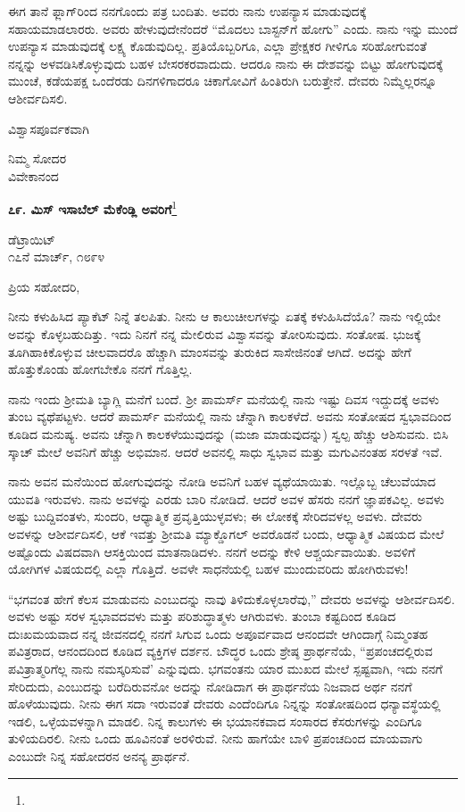ಈಗ ತಾನೆ ಫ್ಲಾಗ್‌ರಿಂದ ನನಗೊಂದು ಪತ್ರ ಬಂದಿತು. ಅವರು ನಾನು ಉಪನ್ಯಾಸ ಮಾಡುವುದಕ್ಕೆ ಸಹಾಯಮಾಡಲಾರರು. ಅವರು ಹೇಳುವುದೇನೆಂದರೆ “ಮೊದಲು ಬಾಸ್ಟನ್‌ಗೆ ಹೋಗು” ಎಂದು. ನಾನು ಇನ್ನು ಮುಂದೆ ಉಪನ್ಯಾಸ ಮಾಡುವುದಕ್ಕೆ ಲಕ್ಷ್ಯ ಕೊಡುವುದಿಲ್ಲ. ಪ್ರತಿಯೊಬ್ಬರಿಗೂ, ಎಲ್ಲಾ ಪ್ರೇಕ್ಷಕರ ಗೀಳಿಗೂ ಸರಿಹೋಗುವಂತೆ ನನ್ನನ್ನು ಅಳವಡಿಸಿಕೊಳ್ಳುವುದು ಬಹಳ ಬೇಸರಕರವಾದುದು. ಆದರೂ ನಾನು ಈ ದೇಶವನ್ನು ಬಿಟ್ಟು ಹೋಗುವುದಕ್ಕೆ ಮುಂಚೆ, ಕಡೆಯಪಕ್ಷ ಒಂದೆರಡು ದಿನಗಳಿಗಾದರೂ ಚಿಕಾಗೋವಿಗೆ ಹಿಂತಿರುಗಿ ಬರುತ್ತೇನೆ. ದೇವರು ನಿಮ್ಮೆಲ್ಲರನ್ನೂ ಆಶೀರ್ವದಿಸಲಿ.

ವಿಶ್ವಾಸಪೂರ್ವಕವಾಗಿ

\begin{flushright}
ನಿಮ್ಮ ಸೋದರ\\ವಿವೇಕಾನಂದ
\end{flushright}

\begin{center}
\textbf{೭೯. ಮಿಸ್ ಇಸಾಬೆಲ್ ಮೆಕೆಂಡ್ಲಿ ಅವರಿಗೆ}\footnote{}
\end{center}

\begin{flushright}
ಡೆಟ್ರಾಯಿಟ್\\೧೭ನೆ ಮಾರ್ಚ್, ೧೮೯೪
\end{flushright}

\noindent
ಪ್ರಿಯ ಸಹೋದರಿ,

ನೀನು ಕಳುಹಿಸಿದ ಪ್ಯಾಕೆಟ್ ನಿನ್ನೆ ತಲಪಿತು. ನೀನು ಆ ಕಾಲುಚೀಲಗಳನ್ನು ಏತಕ್ಕೆ ಕಳುಹಿಸಿದೆಯೊ? ನಾನು ಇಲ್ಲಿಯೇ ಅವನ್ನು ಕೊಳ್ಳಬಹುದಿತ್ತು. ಇದು ನಿನಗೆ ನನ್ನ ಮೇಲಿರುವ ವಿಶ್ವಾಸವನ್ನು ತೋರಿಸುವುದು. ಸಂತೋಷ. ಭುಜಕ್ಕೆ ತೂಗಿಹಾಕಿಕೊಳ್ಳುವ ಚೀಲವಾದರೊ ಹೆಚ್ಚಾಗಿ ಮಾಂಸವನ್ನು ತುರುಕಿದ ಸಾಸೇಜಿನಂತೆ ಆಗಿದೆ. ಅದನ್ನು ಹೇಗೆ ಹೊತ್ತುಕೊಂಡು ಹೋಗಬೇಕೊ ನನಗೆ ಗೊತ್ತಿಲ್ಲ.

ನಾನು ಇಂದು ಶ‍್ರೀಮತಿ ಬ್ಯಾಗ್ಲಿ ಮನೆಗೆ ಬಂದೆ. ಶ‍್ರೀ ಪಾಮ‌ರ್ಸ್ ಮನೆಯಲ್ಲಿ ನಾನು ಇಷ್ಟು ದಿವಸ ಇದ್ದುದಕ್ಕೆ ಅವಳು ತುಂಬ ವ್ಯಥೆಪಟ್ಟಳು. ಆದರೆ ಪಾಮ‌ರ್ಸ್ ಮನೆಯಲ್ಲಿ ನಾನು ಚೆನ್ನಾಗಿ ಕಾಲಕಳೆದೆ. ಅವನು ಸಂತೋಷದ ಸ್ವಭಾವದಿಂದ ಕೂಡಿದ ಮನುಷ್ಯ. ಅವನು ಚೆನ್ನಾಗಿ ಕಾಲಕಳೆಯುವುದನ್ನು (ಮಜಾ ಮಾಡುವುದನ್ನು) ಸ್ವಲ್ಪ ಹೆಚ್ಚು ಆಶಿಸುವನು. ಬಿಸಿ ಸ್ಕಾಚ್ ಮೇಲೆ ಅವನಿಗೆ ಹೆಚ್ಚು ಅಭಿಮಾನ. ಆದರೆ ಅವನಲ್ಲಿ ಸಾಧು ಸ್ವಭಾವ ಮತ್ತು ಮಗುವಿನಂತಹ ಸರಳತೆ ಇವೆ.

ನಾನು ಅವನ ಮನೆಯಿಂದ ಹೋಗುವುದನ್ನು ನೋಡಿ ಅವನಿಗೆ ಬಹಳ ವ್ಯಥೆಯಾಯಿತು. ಇಲ್ಲೊಬ್ಬ ಚೆಲುವೆಯಾದ ಯುವತಿ ಇರುವಳು. ನಾನು ಅವಳನ್ನು ಎರಡು ಬಾರಿ ನೋಡಿದೆ. ಆದರೆ ಅವಳ ಹೆಸರು ನನಗೆ ಜ್ಞಾಪಕವಿಲ್ಲ. ಅವಳು ಅಷ್ಟು ಬುದ್ದಿವಂತಳು, ಸುಂದರಿ, ಆಧ್ಯಾತ್ಮಿಕ ಪ್ರವೃತ್ತಿಯುಳ್ಳವಳು; ಈ ಲೋಕಕ್ಕೆ ಸೇರಿದವಳಲ್ಲ ಅವಳು. ದೇವರು ಅವಳನ್ನು ಆಶೀರ್ವದಿಸಲಿ, ಆಕೆ ಇವತ್ತು ಶ‍್ರೀಮತಿ ಮ್ಯಾಕ್ಡೊಗಲ್ ಅವರೊಡನೆ ಬಂದು, ಆಧ್ಯಾತ್ಮಿಕ ವಿಷಯದ ಮೇಲೆ ಅಷ್ಟೊಂದು ವಿಷದವಾಗಿ ಆಸಕ್ತಿಯಿಂದ ಮಾತನಾಡಿದಳು. ನನಗೆ ಅದನ್ನು ಕೇಳಿ ಆಶ್ಚರ್ಯವಾಯಿತು. ಅವಳಿಗೆ ಯೋಗಿಗಳ ವಿಷಯದಲ್ಲಿ ಎಲ್ಲಾ ಗೊತ್ತಿದೆ. ಅವಳೇ ಸಾಧನೆಯಲ್ಲಿ ಬಹಳ ಮುಂದುವರಿದು ಹೋಗಿರುವಳು!

“ಭಗವಂತ ಹೇಗೆ ಕೆಲಸ ಮಾಡುವನು ಎಂಬುದನ್ನು ನಾವು ತಿಳಿದುಕೊಳ್ಳಲಾರೆವು,” ದೇವರು ಅವಳನ್ನು ಆಶೀರ್ವದಿಸಲಿ. ಅವಳು ಅಷ್ಟು ಸರಳ ಸ್ವಭಾವದವಳು ಮತ್ತು ಪರಿಶುದ್ಧಾತ್ಮಳು ಆಗಿರುವಳು. ತುಂಬಾ ಕಷ್ಟದಿಂದ ಕೂಡಿದ ದುಃಖಮಯವಾದ ನನ್ನ ಜೀವನದಲ್ಲಿ ನನಗೆ ಸಿಗುವ ಒಂದು ಅಪೂರ್ವವಾದ ಆನಂದವೇ ಆಗಿಂದಾಗ್ಗೆ ನಿಮ್ಮಂತಹ ಪವಿತ್ರರಾದ, ಆನಂದದಿಂದ ಕೂಡಿದ ವ್ಯಕ್ತಿಗಳ ದರ್ಶನ. ಬೌದ್ಧರ ಒಂದು ಶ್ರೇಷ್ಠ ಪ್ರಾರ್ಥನೆಯೆ, ``ಪ್ರಪಂಚದಲ್ಲಿರುವ ಪವಿತ್ರಾತ್ಮರಿಗೆಲ್ಲ ನಾನು ನಮಸ್ಕರಿಸುವೆ' ಎನ್ನುವುದು. ಭಗವಂತನು ಯಾರ ಮುಖದ ಮೇಲೆ ಸ್ಪಷ್ಟವಾಗಿ, ಇದು ನನಗೆ ಸೇರಿದುದು, ಎಂಬುದನ್ನು ಬರೆದಿರುವನೋ ಅದನ್ನು ನೋಡಿದಾಗ ಈ ಪ್ರಾರ್ಥನೆಯ ನಿಜವಾದ ಅರ್ಥ ನನಗೆ ಹೊಳೆಯುವುದು. ನೀನು ಈಗ ಸದಾ ಇರುವಂತೆ ದೇವರು ಎಂದೆಂದಿಗೂ ನಿನ್ನನ್ನು ಸಂತೋಷದಿಂದ ಧನ್ಯಾವಸ್ಥೆಯಲ್ಲಿ ಇಡಲಿ, ಒಳ್ಳೆಯವಳನ್ನಾಗಿ ಮಾಡಲಿ. ನಿನ್ನ ಕಾಲುಗಳು ಈ ಭಯಾನಕವಾದ ಸಂಸಾರದ ಕೆಸರುಗಳನ್ನು ಎಂದಿಗೂ ತುಳಿಯದಿರಲಿ. ನೀನು ಒಂದು ಹೂವಿನಂತೆ ಅರಳಿರುವೆ. ನೀನು ಹಾಗೆಯೇ ಬಾಳಿ ಪ್ರಪಂಚದಿಂದ ಮಾಯವಾಗು ಎಂಬುದೇ ನಿನ್ನ ಸಹೋದರನ ಅನನ್ಯ ಪ್ರಾರ್ಥನೆ.

